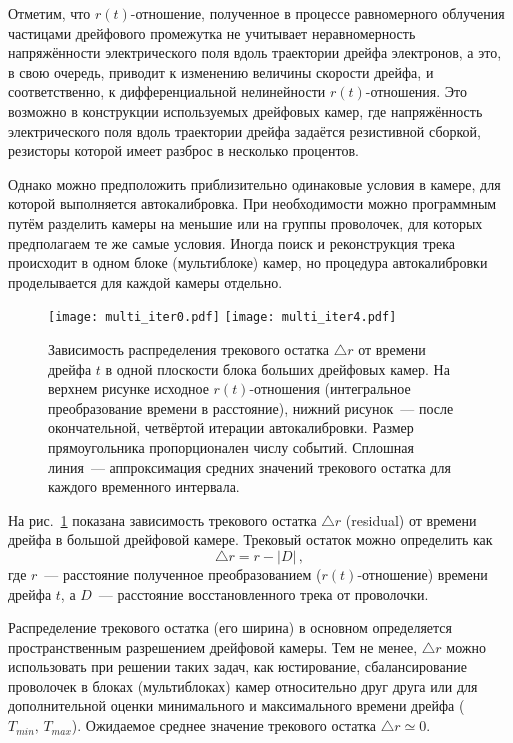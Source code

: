 Отметим, что $r(t)$-отношение, полученное в процессе равномерного облучения
частицами дрейфового промежутка не учитывает неравномерность напряжённости
электрического поля вдоль траектории дрейфа электронов, а это, в свою очередь,
приводит к изменению величины скорости дрейфа, и соответственно, к
дифференциальной нелинейности $r(t)$-отношения. Это возможно в конструкции
используемых дрейфовых камер, где напряжённость электрического поля вдоль
траектории дрейфа задаётся резистивной сборкой, резисторы которой имеет разброс
в несколько процентов.

Однако можно предположить приблизительно одинаковые условия в камере, для
которой выполняется автокалибровка. При необходимости можно программным путём
разделить камеры на меньшие или на группы проволочек, для которых предполагаем
те же самые условия. Иногда поиск и реконструкция трека происходит в одном
блоке (мультиблоке) камер, но процедура автокалибровки проделывается для
каждой камеры отдельно.

\begin{figure}[h]
  \centering
  \texttt{[image: multi\_iter0.pdf]}
  \texttt{[image: multi\_iter4.pdf]}
  \caption{Зависимость распределения трекового остатка $\triangle r$ от времени
    дрейфа $t$ в одной плоскости блока больших дрейфовых камер. На верхнем
    рисунке исходное $r(t)$-отношения (интегральное преобразование времени
    в расстояние), нижний рисунок~--- после окончательной, четвёртой итерации
    автокалибровки. Размер прямоугольника пропорционален числу событий. Сплошная
    линия~--- аппроксимация средних значений трекового остатка для каждого
    временного интервала.}
  \label{fig:multi_iter}
\end{figure}

На рис.~\ref{fig:multi_iter} показана зависимость трекового остатка
$\triangle r$ (residual) от времени дрейфа в большой дрейфовой камере. Трековый
остаток можно определить как
\begin{equation}
  \triangle r = r - |D|\,,
\end{equation}
где $r$~--- расстояние полученное преобразованием ($r(t)$-отношение) времени
дрейфа $t$, а $D$~--- расстояние восстановленного трека от проволочки.

Распределение трекового остатка (его ширина) в основном определяется
пространственным разрешением дрейфовой камеры. Тем не менее, $\triangle r$
можно использовать при решении таких задач, как юстирование, сбалансирование
проволочек в блоках (мультиблоках) камер относительно друг друга или для
дополнительной оценки минимального и максимального времени дрейфа
($T_{min},\,T_{max}$). Ожидаемое среднее значение трекового остатка
$\triangle r \simeq 0$.

